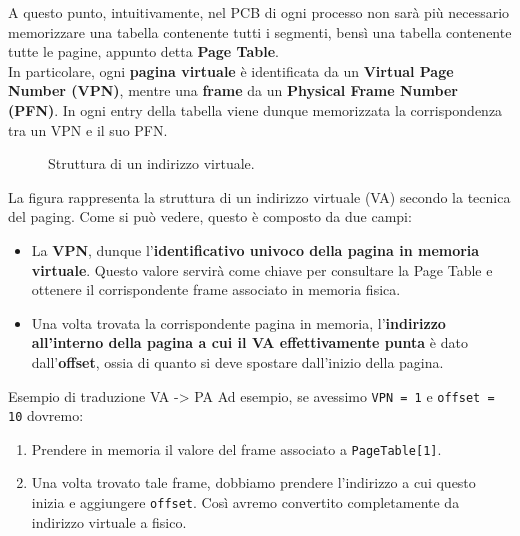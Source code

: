 \documentclass[12pt]{report}
\begin{document}
	A questo punto, intuitivamente, nel PCB di ogni processo non sarà più necessario memorizzare una tabella contenente tutti i segmenti, bensì una tabella contenente tutte le pagine, appunto detta \textbf{Page Table}.\\
	In particolare, ogni \textbf{pagina virtuale} è identificata da un \textbf{Virtual Page Number (VPN)}, mentre una \textbf{frame} da un \textbf{Physical Frame Number (PFN)}. In ogni entry della tabella viene dunque memorizzata la corrispondenza tra un VPN e il suo PFN.
	
	\begin{figure}[htbp]
		\centering
		\caption{Struttura di un indirizzo virtuale.}
	\end{figure}
	La figura rappresenta la struttura di un indirizzo virtuale (VA) secondo la tecnica del paging. Come si può vedere, questo è composto da due campi:
	\begin{itemize}
		\item La \textbf{VPN}, dunque l'\textbf{identificativo univoco della pagina in memoria virtuale}. Questo valore servirà come chiave per consultare la Page Table e ottenere il corrispondente frame associato in memoria fisica.
		
		\item Una volta trovata la corrispondente pagina in memoria, l'\textbf{indirizzo all'interno della pagina a cui il VA effettivamente punta} è dato dall'\textbf{offset}, ossia di quanto si deve spostare dall'inizio della pagina.
	\end{itemize}
	
	\begin{esempio}{Esempio di traduzione VA -> PA}{}
		Ad esempio, se avessimo \texttt{VPN = 1} e \texttt{offset = 10} dovremo:
		\begin{enumerate}
			\item Prendere in memoria il valore del frame associato a \texttt{PageTable[1]}.
			
			\item Una volta trovato tale frame, dobbiamo prendere l'indirizzo a cui questo inizia e aggiungere \texttt{offset}. Così avremo convertito completamente da indirizzo virtuale a fisico.
		\end{enumerate}
	\end{esempio}
	
\end{document}

